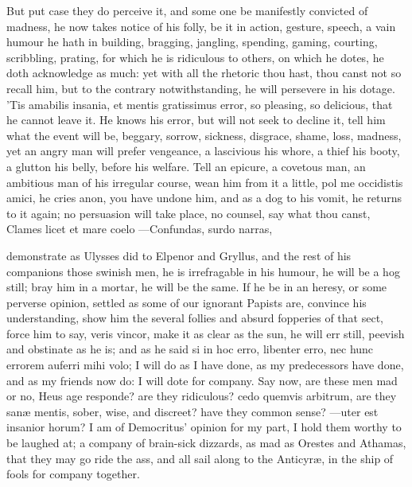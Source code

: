 {But put case they do perceive it, and some one be manifestly convicted
of madness, he now takes notice of his folly, be it in action,
gesture, speech, a vain humour he hath in building, bragging, jangling,
spending, gaming, courting, scribbling, prating, for which he is
ridiculous to others, on which he dotes, he doth acknowledge as
much: yet with all the rhetoric thou hast, thou canst not so recall
him, but to the contrary notwithstanding, he will persevere in his
dotage. 'Tis amabilis insania, et mentis gratissimus error, so
pleasing, so delicious, that he  cannot leave it. He knows his
error, but will not seek to decline it, tell him what the event will
be, beggary, sorrow, sickness, disgrace, shame, loss, madness, yet
an angry man will prefer vengeance, a lascivious his whore, a
thief his booty, a glutton his belly, before his welfare. Tell an
epicure, a covetous man, an ambitious man of his irregular course, wean
him from it a little, pol me occidistis amici, he cries anon, you have
undone him, and as a dog to his vomit, he returns to it again; no
persuasion will take place, no counsel, say what thou canst,
Clames licet et mare coelo
---Confundas, surdo narras,

demonstrate as Ulysses did to Elpenor and Gryllus, and the rest of
his companions those swinish men, he is irrefragable in his humour, he
will be a hog still; bray him in a mortar, he will be the same. If he
be in an heresy, or some perverse opinion, settled as some of our
ignorant Papists are, convince his understanding, show him the several
follies and absurd fopperies of that sect, force him to say, veris
vincor, make it as clear as the sun, he will err still, peevish
and obstinate as he is; and as he said si in hoc erro, libenter
erro, nec hunc errorem auferri mihi volo; I will do as I have done, as
my predecessors have done, and as my friends now do: I will dote
for company. Say now, are these men mad or no, Heus age
responde? are they ridiculous? cedo quemvis arbitrum, are they san\ae{}
mentis, sober, wise, and discreet? have they common sense? ---uter
est insanior horum? I am of Democritus' opinion for my part, I hold
them worthy to be laughed at; a company of brain-sick dizzards, as mad
as Orestes and Athamas, that they may go ride the ass, and all
sail along to the Anticyr\ae{}, in the ship of fools for company together.

}
